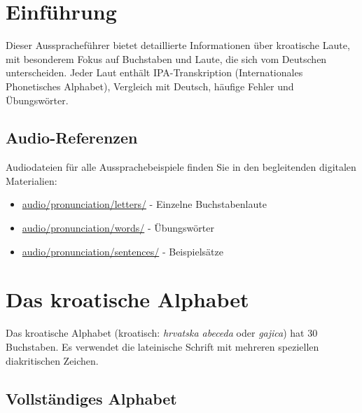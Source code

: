 
\section{Einführung}

Dieser Ausspracheführer bietet detaillierte Informationen über kroatische Laute, mit besonderem Fokus auf Buchstaben und Laute, die sich vom Deutschen unterscheiden. Jeder Laut enthält IPA-Transkription (Internationales Phonetisches Alphabet), Vergleich mit Deutsch, häufige Fehler und Übungswörter.

\subsection{Audio-Referenzen}

Audiodateien für alle Aussprachebeispiele finden Sie in den begleitenden digitalen Materialien:
\begin{itemize}
    \item \small\url{audio/pronunciation/letters/} - Einzelne Buchstabenlaute
    \item \small\url{audio/pronunciation/words/} - Übungswörter
    \item \small\url{audio/pronunciation/sentences/} - Beispielsätze
\end{itemize}

\section{Das kroatische Alphabet}

Das kroatische Alphabet (kroatisch: \textit{hrvatska abeceda} oder \textit{gajica}) hat 30 Buchstaben. Es verwendet die lateinische Schrift mit mehreren speziellen diakritischen Zeichen.

\subsection{Vollständiges Alphabet}

